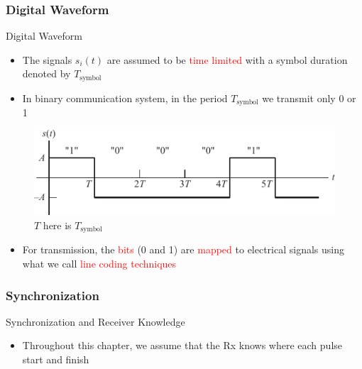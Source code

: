\documentclass{Beamer}
\begin{document}
\subsubsection{Digital Waveform}
\begin{frame}[t]{Digital Waveform}

\begin{itemize}

\item The signals $s_i(t)$ are assumed to be \textcolor{red}{time limited} with a symbol duration denoted by $T_{\text{symbol}}$

\item In binary communication system, in the period $T_{\text{symbol}}$ we transmit only 0 or 1

\end{itemize}

\begin{figure}[h]
\centering
\includegraphics[scale=0.8]{Figures/Baseband_Binary/template_digital_signal}
\caption{$T$ here is $T_{\text{symbol}}$}
\label{fig:Baseband_Binary:template_digital_signal}
\end{figure}

\begin{itemize}

\item For transmission, the \textcolor{red}{bits} (0 and 1) are \textcolor{red}{mapped} to {electrical signals} using what we call \textcolor{red}{line coding techniques}

\end{itemize}



\end{frame}


\subsubsection{Synchronization}
\begin{frame}[t,allowframebreaks]{Synchronization and Receiver Knowledge}

\begin{itemize}

\item Throughout this chapter, we assume that the Rx knows where each pulse start and finish

\end{itemize}


\end{frame}
\end{document}
